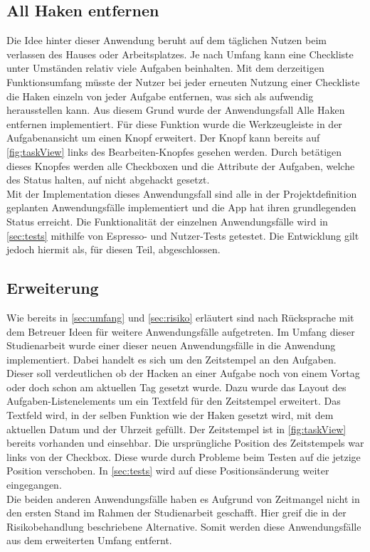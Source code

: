\subsection{All Haken entfernen}\label{subsec:Haken}
Die Idee hinter dieser Anwendung beruht auf dem täglichen Nutzen beim verlassen des Hauses oder Arbeitsplatzes. Je nach Umfang kann eine Checkliste unter Umständen relativ viele Aufgaben beinhalten. Mit dem derzeitigen Funktionsumfang müsste der Nutzer bei jeder erneuten Nutzung einer Checkliste die Haken einzeln von jeder Aufgabe entfernen, was sich als aufwendig herausstellen kann. Aus diesem Grund wurde der Anwendungsfall \glqq Alle Haken entfernen\grqq{} implementiert. Für diese Funktion wurde die Werkzeugleiste in der Aufgabenansicht um einen Knopf erweitert. Der Knopf kann bereits auf \autoref{fig:taskView} links des Bearbeiten-Knopfes gesehen werden. Durch betätigen dieses Knopfes werden alle Checkboxen und die Attribute der Aufgaben, welche des Status halten, auf nicht abgehackt gesetzt.\\
Mit der Implementation dieses Anwendungsfall sind alle in der Projektdefinition geplanten Anwendungsfälle implementiert und die App hat ihren grundlegenden Status erreicht. Die Funktionalität der einzelnen Anwendungsfälle wird in \autoref{sec:tests} mithilfe von Espresso- und Nutzer-Tests getestet. Die Entwicklung gilt jedoch hiermit als, für diesen Teil, abgeschlossen.

\subsection{Erweiterung}\label{subsec:erweiterung}
Wie bereits in \autoref{sec:umfang} und \autoref{sec:risiko} erläutert sind nach Rücksprache mit dem Betreuer Ideen für weitere Anwendungsfälle aufgetreten. Im Umfang dieser Studienarbeit wurde einer dieser neuen Anwendungsfälle in die Anwendung implementiert. Dabei handelt es sich um den Zeitstempel an den Aufgaben. Dieser soll verdeutlichen ob der Hacken an einer Aufgabe noch von einem Vortag oder doch schon am aktuellen Tag gesetzt wurde. Dazu wurde das Layout des Aufgaben-Listenelements um ein Textfeld für den Zeitstempel erweitert. Das Textfeld wird, in der selben Funktion wie der Haken gesetzt wird, mit dem aktuellen Datum und der Uhrzeit gefüllt. Der Zeitstempel ist in \autoref{fig:taskView} bereits vorhanden und einsehbar. Die ursprüngliche Position des Zeitstempels war links von der Checkbox. Diese wurde durch Probleme beim Testen auf die jetzige Position verschoben. In \autoref{sec:tests} wird auf diese Positionsänderung weiter eingegangen.\\
Die beiden anderen Anwendungsfälle haben es Aufgrund von Zeitmangel nicht in den ersten Stand im Rahmen der Studienarbeit geschafft. Hier greif die in der Risikobehandlung beschriebene Alternative. Somit werden diese Anwendungsfälle aus dem erweiterten Umfang entfernt.

